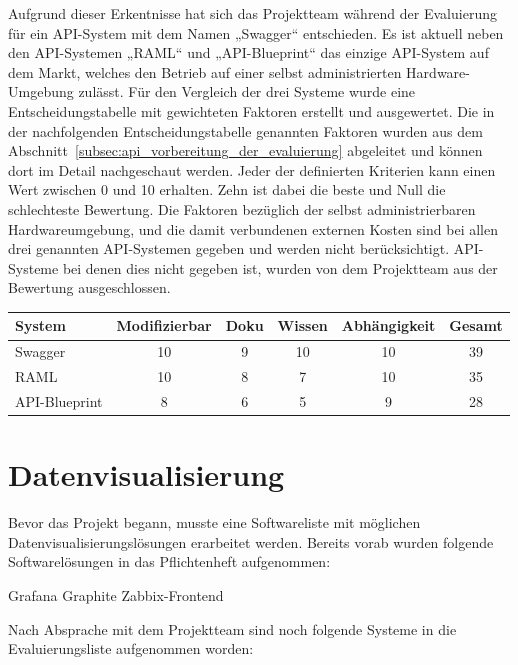 Aufgrund dieser Erkentnisse hat sich das Projektteam während der Evaluierung
für ein API-System mit dem Namen „Swagger“ entschieden. Es ist aktuell neben
den API-Systemen „RAML“ und „API-Blueprint“ das einzige API-System auf dem
Markt, welches den Betrieb auf einer selbst administrierten Hardware-Umgebung
zulässt.  Für den Vergleich der drei Systeme wurde eine Entscheidungstabelle
mit gewichteten Faktoren erstellt und ausgewertet. Die in der nachfolgenden
Entscheidungstabelle genannten Faktoren wurden aus dem
Abschnitt~\ref{subsec:api_vorbereitung_der_evaluierung} abgeleitet und können
dort im Detail nachgeschaut werden. Jeder der definierten Kriterien kann einen
Wert zwischen 0 und 10 erhalten. Zehn ist dabei die beste und Null die
schlechteste Bewertung. Die Faktoren bezüglich der selbst administrierbaren
Hardwareumgebung, und die damit verbundenen externen Kosten sind bei allen drei
genannten API-Systemen gegeben und werden nicht berücksichtigt. API-Systeme bei
denen dies nicht gegeben ist, wurden von dem Projektteam aus der Bewertung
ausgeschlossen.

\begin{center}
\begin{tabular}{lccccc}
  \toprule
  System & Modifizierbar & Doku & Wissen & Abhängigkeit & Gesamt \\
  \midrule
  Swagger       & 10 & 9  & 10 & 10 & 39 \\
  RAML          & 10 & 8  & 7  & 10 & 35 \\
  API-Blueprint & 8  & 6  & 5  & 9  & 28 \\
  \bottomrule
\end{tabular}
\end{center}
\nl%

\section{Datenvisualisierung}
\label{sec:datenvisualisierung}
Bevor das Projekt begann, musste eine Softwareliste mit möglichen
Datenvisualisierungslösungen erarbeitet werden. Bereits vorab wurden folgende
Softwarelösungen in das Pflichtenheft aufgenommen:

\begin{outline}
  \1 Grafana
  \1 Graphite
  \1 Zabbix-Frontend
\end{outline}

Nach Absprache mit dem Projektteam sind noch folgende Systeme in die
Evaluierungsliste aufgenommen worden:


